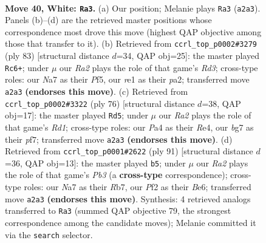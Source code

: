 \documentclass[11pt]{article}
\begin{document}
\clearpage

\begin{figure}[p]\centering
\begin{subfigure}{0.46\textwidth}\centering
\resizebox{\linewidth}{!}{%
\newchessgame
\chessboard[
  setfen={8/Np4bk/6p1/5p1p/P7/6P1/RPr2PKP/4r3 w - - 1 40},
  showmover=false,
  pgfstyle=straightmove, color=movearrow, markmove={a2-a3}
]}
\caption{}
\end{subfigure}\hfill
\begin{subfigure}{0.46\textwidth}\centering
\resizebox{\linewidth}{!}{%
\newchessgame
\chessboard[
  setfen={8/4R1pk/p2r3p/1p3p2/5P2/6P1/PPK4P/8 b - - 17 42},
  showmover=false,
  pgfstyle=straightmove, color=movearrow, markmove={d6-c6}
]}
\caption{}
\end{subfigure}
\\[4pt]
\begin{subfigure}{0.46\textwidth}\centering
\resizebox{\linewidth}{!}{%
\newchessgame
\chessboard[
  setfen={6k1/5p2/7p/6p1/P3R3/1r4P1/r4PKP/3R4 w - - 0 39},
  showmover=false,
  pgfstyle=straightmove, color=movearrow, markmove={d1-d5}
]}
\caption{}
\end{subfigure}\hfill
\begin{subfigure}{0.46\textwidth}\centering
\resizebox{\linewidth}{!}{%
\newchessgame
\chessboard[
  setfen={R7/1r3pk1/1p2b1p1/p6p/4P3/5PP1/5K2/1R6 b - - 1 46},
  showmover=false,
  pgfstyle=straightmove, color=movearrow, markmove={b6-b5}
]}
\caption{}
\end{subfigure}
\caption{\textbf{Move 40, White: \texttt{Ra3}.} (a) Our position; Melanie plays \texttt{Ra3} (\texttt{a2a3}). Panels (b)--(d) are the retrieved master positions whose correspondence most drove this move (highest QAP objective among those that transfer to it). (b) Retrieved from \texttt{ccrl\_top\_p0002\#3279} (ply 83) [structural distance $d$=34, QAP obj=25]: the master played \texttt{Rc6+}; under $\mu$ our \emph{Ra2} plays the role of that game's \emph{Rd3}; cross-type roles: our \emph{N}a7 as their \emph{P}f5, our \emph{r}e1 as their \emph{p}a2; transferred move \texttt{a2a3} \textbf{(endorses this move)}. (c) Retrieved from \texttt{ccrl\_top\_p0002\#3322} (ply 76) [structural distance $d$=38, QAP obj=17]: the master played \texttt{Rd5}; under $\mu$ our \emph{Ra2} plays the role of that game's \emph{Rd1}; cross-type roles: our \emph{P}a4 as their \emph{R}e4, our \emph{b}g7 as their \emph{p}f7; transferred move \texttt{a2a3} \textbf{(endorses this move)}. (d) Retrieved from \texttt{ccrl\_top\_p0001\#2622} (ply 91) [structural distance $d$=36, QAP obj=13]: the master played \texttt{b5}; under $\mu$ our \emph{Ra2} plays the role of that game's \emph{Pb3} (a \textbf{cross-type} correspondence); cross-type roles: our \emph{N}a7 as their \emph{R}b7, our \emph{P}f2 as their \emph{B}e6; transferred move \texttt{a2a3} \textbf{(endorses this move)}. Synthesis: 4 retrieved analogs transferred to \texttt{Ra3} (summed QAP objective 79, the strongest correspondence among the candidate moves); Melanie committed it via the \texttt{search} selector.}
\label{fig:thought-m78}
\end{figure}
\end{document}
